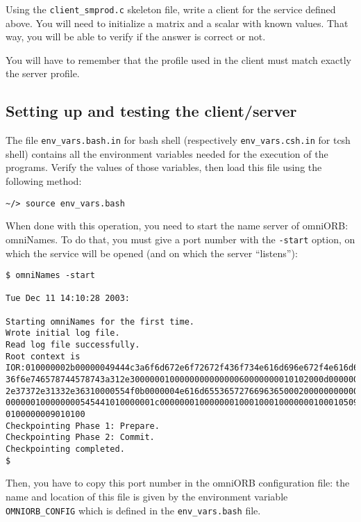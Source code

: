 \documentclass[11pt,a4paper]{article}
\begin{document}
Using the \texttt{client\_smprod.c} skeleton file, write a client for
the service defined above. You will need to initialize a matrix and a
scalar with known values. That way, you will be able to verify if the
answer is correct or not. \par

You will have to remember that the profile used in the client must match 
exactly the server profile.

\subsection{Setting up and testing the client/server}

The file \texttt{env\_vars.bash.in} for bash shell (respectively
\texttt{env\_vars.csh.in} for tcsh shell) contains all the environment
variables needed for the execution of the programs. Verify the values
of those variables, then load this file using the following method:

\footnotesize
\begin{verbatim}
~/> source env_vars.bash   
\end{verbatim}
\normalsize

When done with this operation, you need to start the name server of omniORB:
omniNames. To do that, you must give a port number with the \texttt{-start}
option, on which the service will be opened (and on which the server
``listens''):
\footnotesize
\begin{verbatim}
$ omniNames -start 

Tue Dec 11 14:10:28 2003:

Starting omniNames for the first time.
Wrote initial log file.
Read log file successfully.
Root context is
IOR:010000002b00000049444c3a6f6d672e6f72672f436f734e616d696e672f4e616d696e674
36f6e746578744578743a312e300000010000000000000060000000010102000d000000313430
2e37372e31332e36310000554f0b0000004e616d6553657276696365000200000000000000080
000000100000000545441010000001c0000000100000001000100010000000100010509010100
0100000009010100
Checkpointing Phase 1: Prepare.
Checkpointing Phase 2: Commit.
Checkpointing completed.
$
\end{verbatim}
\normalsize

Then, you have to copy this port number in the omniORB configuration file: the
name and location of this file is given by the environment variable 
\texttt{OMNIORB\_CONFIG} which is defined in the \texttt{env\_vars.bash} file.
\par
\end{document}
